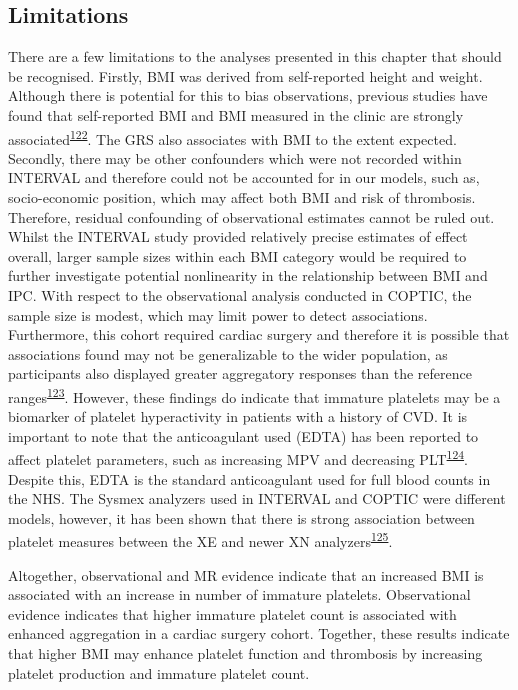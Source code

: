 \documentclass[11pt,twoside]{bristolthesis}
\begin{document}
\hypertarget{INTERVAL-limitations}{%
\subsection{Limitations}\label{INTERVAL-limitations}}

There are a few limitations to the analyses presented in this chapter that should be recognised. Firstly, BMI was derived from self-reported height and weight. Although there is potential for this to bias observations, previous studies have found that self-reported BMI and BMI measured in the clinic are strongly associated\textsuperscript{\protect\hyperlink{ref-Nikolaou2017}{122}}. The GRS also associates with BMI to the extent expected. Secondly, there may be other confounders which were not recorded within INTERVAL and therefore could not be accounted for in our models, such as, socio-economic position, which may affect both BMI and risk of thrombosis. Therefore, residual confounding of observational estimates cannot be ruled out. Whilst the INTERVAL study provided relatively precise estimates of effect overall, larger sample sizes within each BMI category would be required to further investigate potential nonlinearity in the relationship between BMI and IPC. With respect to the observational analysis conducted in COPTIC, the sample size is modest, which may limit power to detect associations. Furthermore, this cohort required cardiac surgery and therefore it is possible that associations found may not be generalizable to the wider population, as participants also displayed greater aggregatory responses than the reference ranges\textsuperscript{\protect\hyperlink{ref-Marcucci2015}{123}}. However, these findings do indicate that immature platelets may be a biomarker of platelet hyperactivity in patients with a history of CVD. It is important to note that the anticoagulant used (EDTA) has been reported to affect platelet parameters, such as increasing MPV and decreasing PLT\textsuperscript{\protect\hyperlink{ref-Mannuuxdf2020}{124}}. Despite this, EDTA is the standard anticoagulant used for full blood counts in the NHS. The Sysmex analyzers used in INTERVAL and COPTIC were different models, however, it has been shown that there is strong association between platelet measures between the XE and newer XN analyzers\textsuperscript{\protect\hyperlink{ref-Briggs2012}{125}}.

Altogether, observational and MR evidence indicate that an increased BMI is associated with an increase in number of immature platelets. Observational evidence indicates that higher immature platelet count is associated with enhanced aggregation in a cardiac surgery cohort. Together, these results indicate that higher BMI may enhance platelet function and thrombosis by increasing platelet production and immature platelet count.
\end{document}
